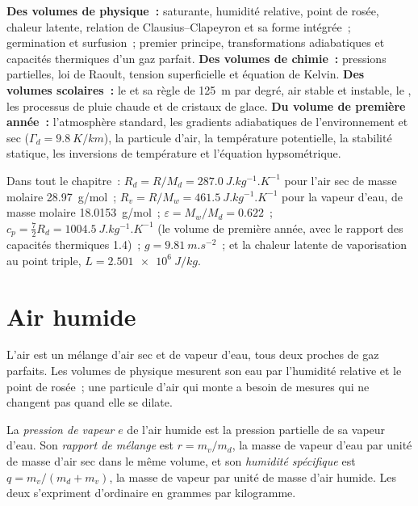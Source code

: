 \begin{recall}
\textbf{Des volumes de physique~:}  saturante, humidité relative, point de rosée,
chaleur latente, relation de Clausius--Clapeyron et sa forme intégrée~; germination et surfusion~;
premier principe, transformations adiabatiques et capacités thermiques d'un gaz parfait.
\textbf{Des volumes de chimie~:} pressions partielles, loi de Raoult, tension superficielle et équation
de Kelvin. \textbf{Des volumes scolaires~:} le  et sa règle de \qty{125}{m}
par degré, air stable et instable, le , les processus de pluie chaude et de
cristaux de glace. \textbf{Du volume de première année~:} l'atmosphère standard, les gradients
adiabatiques de l'environnement et sec ($\Gamma_d = \qty{9.8}{K/km}$), la particule d'air, la température
potentielle, la stabilité statique, les inversions de température et l'équation hypsométrique.
\end{recall}

Dans tout le chapitre~: $R_d = R/M_d = \qty{287.0}{J.kg^{-1}.K^{-1}}$ pour l'air sec de masse
molaire \qty{28.97}{g/mol}~; $R_v = R/M_w = \qty{461.5}{J.kg^{-1}.K^{-1}}$ pour la vapeur d'eau,
de masse molaire \qty{18.0153}{g/mol}~; $\varepsilon = M_w/M_d = 0.622$~; $c_p = \tfrac72 R_d =
\qty{1004.5}{J.kg^{-1}.K^{-1}}$ (le volume de première année, avec le rapport
des capacités thermiques 1.4)~; $g = \qty{9.81}{m.s^{-2}}$~; et la
chaleur latente de vaporisation au point triple, $L = \qty{2.501e6}{J/kg}$.

\section{Air humide}\label{sec:b2:atmospheric-thermodynamics:moist-air}

L'air est un mélange d'air sec et de vapeur d'eau, tous deux proches de gaz parfaits. Les
volumes de physique mesurent son eau par l'humidité relative et le point de rosée~; une
particule d'air qui monte a besoin de mesures qui ne changent pas quand elle se dilate.

\begin{definition}\label{def:b2:atmospheric-thermodynamics:moist-air}
La \emph{pression de vapeur} $e$ de l'air humide est la pression
partielle de sa vapeur d'eau. Son \emph{rapport de mélange} est $r = m_v/m_d$,
la masse de vapeur d'eau par unité de masse d'air sec dans le même volume, et son
\emph{humidité spécifique} est $q = m_v/(m_d + m_v)$, la masse de vapeur
par unité de masse d'air humide. Les deux s'expriment d'ordinaire en grammes par kilogramme.
\end{definition}

